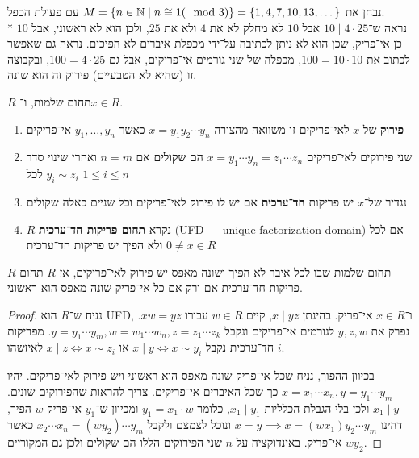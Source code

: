 \begin{example}
	נבחן את $M = \{ n \in \mathbb{N} \mid n \cong 1 (\mod 3) \} = \{ 1, 4, 7, 10, 13, \dots \}$ עם פעולת הכפל. \\*
	נראה ש־$10 \mid 4 \cdot 25$ אבל $10$ לא מחלק לא את $4$ ולא את $25$, ולכן הוא לא ראשוני, אבל $10$ כן אי־פריק, שכן הוא לא ניתן לכתיבה על־ידי מכפלת איברים לא הפיכים.
	נראה גם שאפשר לכתוב את $100 = 10 \cdot 10$, מכפלה של שני גורמים אי־פריקים, אבל גם $100 = 4 \cdot 25$, ובקבוצה זו (שהיא לא הטבעיים) פירוק זה הוא שונה.
\end{example}
\begin{definition}[פירוק]
	$R$ תחום שלמות, ו־$x \in R$.
	\begin{enumerate}
		\item \textbf{פירוק} של $x$ לאי־פריקים זו משוואה מהצורה $x = y_1 y_2 \cdots y_n$ כאשר $y_1, \dots, y_n$ אי־פריקים
		\item שני פירוקים לאי־פריקים $x = y_1 \cdots y_n = z_1 \cdots z_n$ הם \textbf{שקולים} אם $n = m$ ואחרי שינוי סדר $y_i \sim z_i$ לכל $1 \le i \le n$
		\item נגדיר של־$x$ יש פריקות \textbf{חד־ערכית} אם יש לו פירוק לאי־פריקים וכל שניים כאלה שקולים
		\item $R$ נקרא \textbf{תחום פריקות חד־ערכית} (UFD --- unique factorization domain) אם לכל $0 \ne x \in R$ ולא הפיך יש פריקות חד־ערכית
	\end{enumerate}
\end{definition}
\begin{proposition}
	$R$ תחום שלמות שבו לכל איבר לא הפיך ושונה מאפס יש פירוק לאי־פריקים, אז
	$R$ תחום פריקות חד־ערכית אם ורק אם כל אי־פריק שונה מאפס הוא ראשוני.
\end{proposition}
\begin{proof}
	נניח ש־$R$ הוא UFD, ו־$x \in R$ אי־פריק.
	בהינתן $x \mid yz$, קיים $w \in R$ עבורו $xw = yz$.
	נפרק את $y, z, w$ לגורמים אי־פריקים ונקבל $y = y_1 \cdots y_m, w = w_1 \cdots w_n, z = z_1 \cdots z_k$.
	מפריקות חד־ערכית נקבל $x \mid y \iff x \sim y_i$ או $x \mid z \iff x \sim z_i$ לאיזשהו $i$.

	בכיוון ההפוך, נניח שכל אי־פריק שונה מאפס הוא ראשוני ויש פירוק לאי־פריקים.
	יהיו $x = x_1 \cdots x_n, y = y_1 \cdots y_m$ כך שכל האיברים אי־פריקים. צריך להראות שהפירוקים שונים.
	$x_1 \mid y$ ולכן בלי הגבלת הכלליות $x_1 \mid y_1$,
	כלומר $y_1 = x_1 \cdot w$ ומכיוון ש־$y_1$ אי־פריק $w$ הפיך, דהינו $x = y \implies x = (wx_1) y_2 \cdots y_m$ ונוכל לצמצם ולקבל $x_2 \cdots x_n = (wy_2) \cdots y_m$ כאשר $wy_2$ אי־פריק.
	באינדוקציה על $n$ שני הפירוקים הללו הם שקולים ולכן גם המקוריים.
\end{proof}
